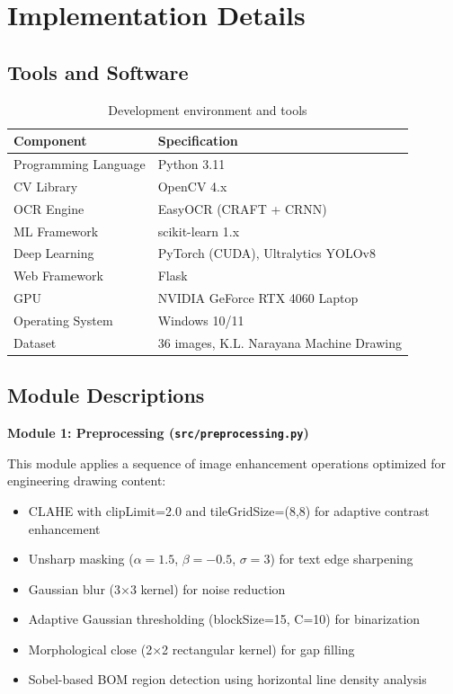 \documentclass[12pt,a4paper]{article}
\begin{document}
\section{Implementation Details}

\subsection{Tools and Software}

\begin{table}[H]
\centering
\caption{Development environment and tools}
\begin{tabular}{ll}
\toprule
\textbf{Component} & \textbf{Specification} \\
\midrule
Programming Language & Python 3.11 \\
CV Library & OpenCV 4.x \\
OCR Engine & EasyOCR (CRAFT + CRNN) \\
ML Framework & scikit-learn 1.x \\
Deep Learning & PyTorch (CUDA), Ultralytics YOLOv8 \\
Web Framework & Flask \\
GPU & NVIDIA GeForce RTX 4060 Laptop \\
Operating System & Windows 10/11 \\
Dataset & 36 images, K.L. Narayana Machine Drawing \\
\bottomrule
\end{tabular}
\end{table}

\subsection{Module Descriptions}

\textbf{Module 1: Preprocessing (\texttt{src/preprocessing.py})}

This module applies a sequence of image enhancement operations optimized for engineering drawing content:
\begin{itemize}[noitemsep]
    \item CLAHE with clipLimit=2.0 and tileGridSize=(8,8) for adaptive contrast enhancement
    \item Unsharp masking ($\alpha=1.5$, $\beta=-0.5$, $\sigma=3$) for text edge sharpening
    \item Gaussian blur (3$\times$3 kernel) for noise reduction
    \item Adaptive Gaussian thresholding (blockSize=15, C=10) for binarization
    \item Morphological close (2$\times$2 rectangular kernel) for gap filling
    \item Sobel-based BOM region detection using horizontal line density analysis
\end{itemize}
\end{document}
